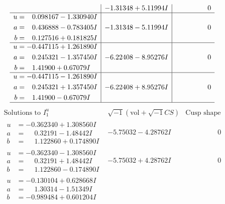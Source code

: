 \documentclass[1p]{elsarticle_modified}
\theoremstyle{definition}
\newcommand{\I}{\sqrt{-1}}
\begin{document}
$$\begin{array}{c|c|c}
 & -1.31348 + 5.11994 I & \phantom{-0.000000 } 0 \\ \hline\begin{aligned}
u &= \phantom{-}0.098167 - 1.330940 I \\
a &= \phantom{-}0.436888 - 0.783405 I \\
b &= \phantom{-}0.127516 + 0.181825 I\end{aligned}
 & -1.31348 - 5.11994 I & \phantom{-0.000000 } 0 \\ \hline\begin{aligned}
u &= -0.447115 + 1.261890 I \\
a &= \phantom{-}0.245321 - 1.357450 I \\
b &= \phantom{-}1.41900 + 0.67079 I\end{aligned}
 & -6.22408 - 8.95276 I & \phantom{-0.000000 } 0 \\ \hline\begin{aligned}
u &= -0.447115 - 1.261890 I \\
a &= \phantom{-}0.245321 + 1.357450 I \\
b &= \phantom{-}1.41900 - 0.67079 I\end{aligned}
 & -6.22408 + 8.95276 I & \phantom{-0.000000 } 0\\
 \hline 
 \end{array}$$\newpage$$\begin{array}{c|c|c}  
\text{Solutions to }I^u_{1}& \I (\text{vol} + \sqrt{-1}CS) & \text{Cusp shape}\\
 \hline 
\begin{aligned}
u &= -0.362340 + 1.308560 I \\
a &= \phantom{-}0.32191 - 1.48442 I \\
b &= \phantom{-}1.122860 + 0.174890 I\end{aligned}
 & -5.75032 - 4.28762 I & \phantom{-0.000000 } 0 \\ \hline\begin{aligned}
u &= -0.362340 - 1.308560 I \\
a &= \phantom{-}0.32191 + 1.48442 I \\
b &= \phantom{-}1.122860 - 0.174890 I\end{aligned}
 & -5.75032 + 4.28762 I & \phantom{-0.000000 } 0 \\ \hline\begin{aligned}
u &= -0.130104 + 0.628668 I \\
a &= \phantom{-}1.30314 - 1.51349 I \\
b &= -0.989484 + 0.601204 I\end{aligned}

\end{array}$$
\end{document}
